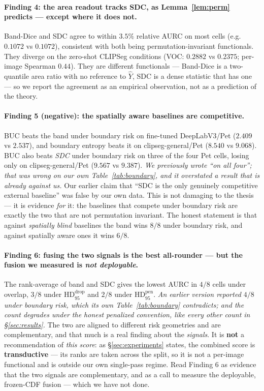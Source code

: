 \documentclass[11pt]{article}
\theoremstyle{remark}
\newcommand{\Yhat}{\widehat{Y}}
\newcommand{\HDF}{\mathrm{HD}_{95}}
\begin{document}
\paragraph{Finding 4: the area readout tracks SDC, as Lemma~\ref{lem:perm} predicts
--- except where it does not.} Band-Dice and SDC agree to within $3.5\%$ relative
AURC on most cells (e.g.\ $0.1072$ vs $0.1072$), consistent with both being
permutation-invariant functionals. They diverge on the zero-shot CLIPSeg conditions
(VOC: $0.2882$ vs $0.2375$; per-image Spearman $0.44$). They are different
functionals --- Band-Dice is a two-quantile area ratio with no reference to $\Yhat$,
SDC is a dense statistic that has one --- so we report the agreement as an empirical
observation, not as a prediction of the theory.

\paragraph{Finding 5 (negative): the spatially aware baselines are competitive.}
BUC \cite{buc} beats the band under boundary risk on fine-tuned DeepLabV3/Pet
($2.409$ vs $2.537$), and boundary entropy \cite{metaseg} beats it on
clipseg-general/Pet ($8.540$ vs $9.068$). BUC also beats \emph{SDC} under boundary
risk on three of the four Pet cells, losing only on clipseg-general/Pet ($9.567$ vs
$9.387$). \emph{We previously wrote ``on all four''; that was wrong on our own
Table~\ref{tab:boundary}, and it overstated a result that is already against us.}
Our earlier claim that ``SDC is the only genuinely
competitive external baseline'' was false by our own data. This is not damaging to
the thesis --- it is evidence \emph{for} it: the baselines that compete under
boundary risk are exactly the two that are not permutation invariant. The honest
statement is that against \emph{spatially blind} baselines the band wins $8/8$ under
boundary risk, and against spatially aware ones it wins $6/8$.

\paragraph{Finding 6: fusing the two signals is the best all-rounder --- but the fusion
we measured is \emph{not deployable}.} The rank-average of band and SDC gives the lowest
AURC in $4/8$ cells under overlap, $3/8$ under $\HDF^{\mathrm{drop}}$ and $2/8$ under
$\HDF^{\mathrm{pen}}$. \emph{An earlier version reported $4/8$ under boundary risk,
which its own Table~\ref{tab:boundary} contradicts; and the count degrades under the
honest penalized convention, like every other count in \S\ref{sec:results}.} The two
are aligned to
different risk geometries and are complementary, and that much is a real finding about
the \emph{signals}. It is \textbf{not} a recommendation of \emph{this score}: as
\S\ref{sec:experiments} states, the combined score is \textbf{transductive} --- its
ranks are taken across the split, so it is not a per-image functional and is outside our
own single-pass regime. Read Finding 6 as evidence that the two signals are
complementary, and as a call to measure the deployable, frozen-CDF fusion --- which we
have not done.
\end{document}
